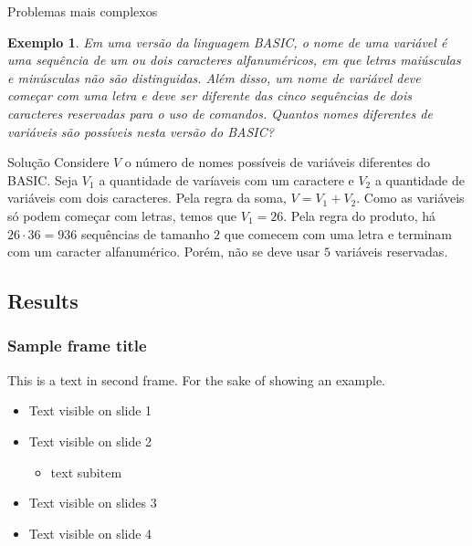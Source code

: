\documentclass[aspectratio=169,t]{beamer}
\newtheorem{ex}{Exemplo}
\begin{document}
 \begin{frame}{Problemas mais complexos}
\footnotesize
  \begin{ex}
Em uma versão da linguagem BASIC, o nome de uma variável é uma sequência de um ou dois caracteres alfanuméricos, em que letras maiúsculas e minúsculas não são distinguidas. Além disso, um nome de variável deve começar com uma letra e deve ser diferente das cinco sequências de dois caracteres reservadas para o uso de comandos. Quantos nomes diferentes de variáveis são possíveis nesta versão do BASIC?
  \end{ex}

\begin{block}{Solução}
Considere $V$ o número de nomes possíveis de variáveis diferentes do BASIC. Seja $V_1$ a quantidade de varíaveis com um caractere e $V_2$ a quantidade de variáveis com dois caracteres. Pela regra da soma, $V=V_1+V_2$. Como as variáveis só podem começar com letras, temos que $V_1=26$. Pela regra do produto, há $26\cdot 36=936$ sequências de tamanho $2$ que comecem com uma letra e terminam com um caracter alfanumérico. Porém, não se deve usar $5$ variáveis reservadas.
  \end{block}

 \end{frame}

\subsection{Results}
\begin{frame}
\frametitle{Sample frame title}
This is a text in second frame. For the sake of showing an example.

\begin{itemize}
    \item<1-> Text visible on slide 1
    \item<2-> Text visible on slide 2
    \begin{itemize}
        \item text subitem
    \end{itemize}
    \item<3> Text visible on slides 3
    \item<4-> Text visible on slide 4
\end{itemize}
\end{frame}

\titlepage
\end{document}
